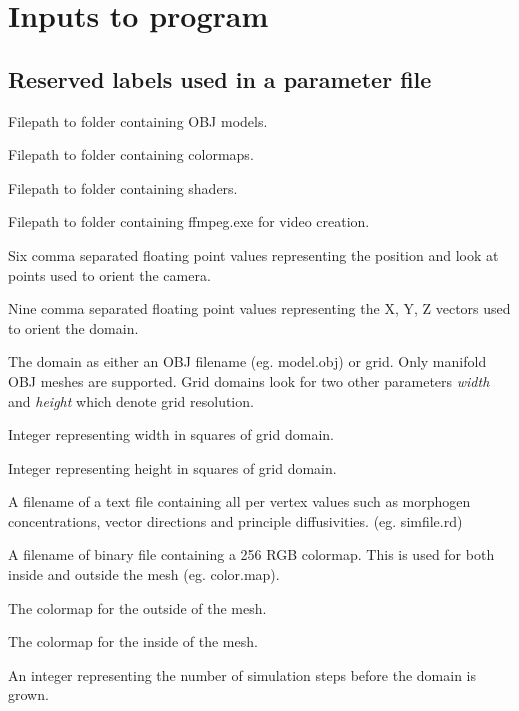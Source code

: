 \chapter{Inputs to program}
\section{Reserved labels used in a parameter file}
\label{appendix:Reservedlabels}

\begin{description}[itemsep=0cm]
    \item[ModelsPath:] Filepath to folder containing OBJ models.
    \item[ColorMapsPath:] Filepath to folder containing colormaps.
    \item[ShadersPath:] Filepath to folder containing shaders.
    \item[ffmpegPath:] Filepath to folder containing ffmpeg.exe for video creation.
    \item[camera:] Six comma separated floating point values representing the position and look at points used to orient the camera.
    \item[model:] Nine comma separated floating point values representing the X, Y, Z vectors used to orient the domain. 
    \item[domain:] The domain as either an OBJ filename (eg. model.obj) or grid. Only manifold OBJ meshes are supported. Grid domains look for two other parameters \textit{width} and \textit{height} which denote grid resolution.
    \item[width:] Integer representing width in squares of grid domain.
    \item[height:] Integer representing height in squares of grid domain.
    \item[simFile:] A filename of a text file containing all per vertex values such as morphogen concentrations, vector directions and principle diffusivities. (eg. simfile.rd)
    \item[colorMap:] A filename of binary file containing a 256 RGB colormap. This is used for both inside and outside the mesh (eg. color.map).
    \item[colorMapOutside:] The colormap for the outside of the mesh.
    \item[colorMapInside:] The colormap for the inside of the mesh.
    \item[growthTickLimit:] An integer representing the number of simulation steps before the domain is grown.

\end{description}
